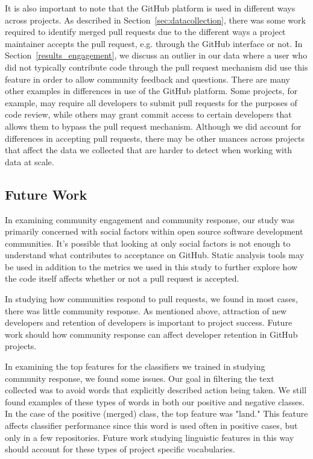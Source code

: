 \documentclass{sigchi}
\begin{document}
It is also important to note that the GitHub platform is used in different ways
across projects. As described in Section~\ref{sec:datacollection}, there was
some work required to identify merged pull requests due to the different ways a
project maintainer accepts the pull request, e.g. through the GitHub interface
or not. In Section~\ref{results_engagement}, we discuss an outlier in our data
where a user who did not typically contribute code through the pull request
mechanism did use this feature in order to allow community feedback and
questions. There are many other examples in differences in use of the GitHub
platform. Some projects, for example, may require all developers to submit pull
requests for the purposes of code review, while others may grant commit access
to certain developers that allows them to bypass the pull request mechanism.
Although we did account for differences in accepting pull requests, there may be
other nuances across projects that affect the data we collected that are harder
to detect when working with data at scale.

\subsection{Future Work} \label{sec:future_work}

In examining community engagement and community response, our study was
primarily concerned with social factors within open source software development
communities. It's possible that looking at only social factors is not enough to
understand what contributes to acceptance on GitHub. Static analysis tools may
be used in addition to the metrics we used in this study to further explore how
the code itself affects whether or not a pull request is accepted.

In studying how communities respond to pull requests, we found in most cases, there was little
community response. As mentioned above, attraction of new developers and
retention of developers is important to project success. Future work should how
community response can affect developer retention in GitHub projects.

In examining the top features for the classifiers we trained in studying
community response, we found some issues. Our goal in filtering the text
collected was to avoid words that explicitly described action being taken. We
still found examples of these types of words in both our positive and negative
classes. In the case of the positive (merged) class, the top feature was
"land." This feature affects classifier performance since this word is used
often in positive cases, but only in a few repositories. Future work studying
linguistic features in this way should account for these types of project
specific vocabularies.
\end{document}
